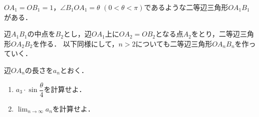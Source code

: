 \documentclass[../../main.tex]{subfiles}
\begin{document}
$OA_1=OB_1=1$，$\angle B_1OA_1=\theta$ $(0<\theta<\pi)$であるような二等辺三角形$OA_1B_1$がある．

辺$A_1B_1$の中点を$B_2$とし，辺$OA_1$上に$OA_2=OB_2$となる点$A_2$をとり，二等辺三角形$OA_2B_2$を作る．
以下同様にして，$n>2$についても二等辺三角形$OA_nB_n$を作っていく．

辺$OA_n$の長さを$a_n$とおく．
\begin{enumerate}
  \item $\displaystyle a_3\cdot\sin\dfrac{\theta}{4}$を計算せよ．
  \item $\displaystyle\lim_{n\to\infty}a_n$を計算せよ．
\end{enumerate}
\end{document}
